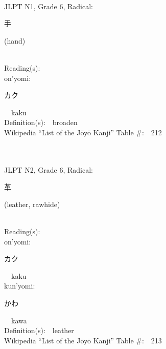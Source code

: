 \begin{multicols}{2}
{\fontsize{34pt}{40pt}  }\ \ \\  %
{JLPT N1, Grade 6, Radical:\ \ {\begin{CJK}{UTF8}{min} 手 \end{CJK}} (hand) } \\
Reading(s):\ \ \\
{\hspace*{1em}}on'yomi:\ \ \\
{\hspace*{2em}}{\begin{CJK}{UTF8}{min} カク \end{CJK}}\ \ kaku\ \ \\
Definition(s):\ \ broaden \\
Wikipedia ``List of the J\=oy\=o Kanji'' Table \#:\ \ 212 \\
\ \ \\
{\fontsize{34pt}{40pt}  }\ \ \\  %
{JLPT N2, Grade 6, Radical:\ \ {\begin{CJK}{UTF8}{min} 革 \end{CJK}} (leather, rawhide) } \\
Reading(s):\ \ \\
{\hspace*{1em}}on'yomi:\ \ \\
{\hspace*{2em}}{\begin{CJK}{UTF8}{min} カク \end{CJK}}\ \ kaku\ \ \\
{\hspace*{1em}}kun'yomi:\ \ \\
{\hspace*{2em}}{\begin{CJK}{UTF8}{min} かわ \end{CJK}}\ \ kawa\ \ \\
Definition(s):\ \ leather \\
Wikipedia ``List of the J\=oy\=o Kanji'' Table \#:\ \ 213 \\
\ \ \\
{\fontsize{34pt}{40pt}  }\ \ \\  %

\end{multicols}
